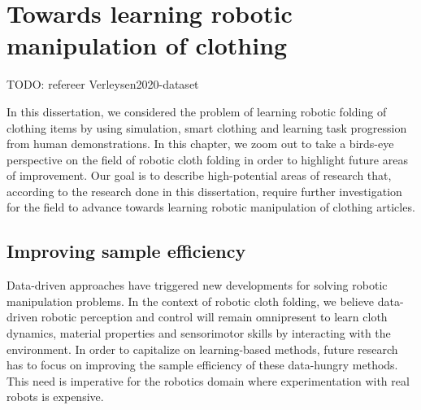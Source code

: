 \documentclass[\home/main.tex]{subfiles}
\begin{document}
\chapter{Towards learning robotic manipulation of clothing} \label{ch:towards_robotic_folding}
TODO: refereer Verleysen2020-dataset 

In this dissertation, we considered the problem of learning robotic folding of clothing items by using simulation, smart clothing and learning task progression from human demonstrations. In this chapter, we zoom out to take a birds-eye perspective on the field of robotic cloth folding in order to highlight future areas of improvement. Our goal is to describe high-potential areas of research that, according to the research done in this dissertation, require further investigation for the field to advance towards learning robotic manipulation of clothing articles.

\section{Improving sample efficiency}

Data-driven approaches have triggered new developments for solving robotic manipulation problems. In the context of robotic cloth folding, we believe data-driven robotic perception and control will remain omnipresent to learn cloth dynamics, material properties and sensorimotor skills by interacting with the environment. In order to capitalize on learning-based methods, future research has to focus on improving the sample efficiency of these data-hungry methods. This need is imperative for the robotics domain where experimentation with real robots is expensive. 
\end{document}
